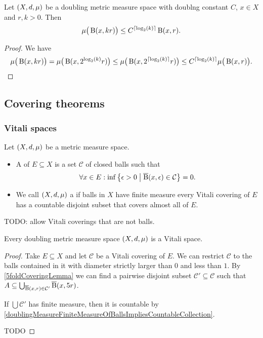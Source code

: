 \begin{lemma}
Let $\sSet{X,d,\mu}$ be a doubling metric measure space with doublng constant $C$, $x\in X$ and $r,k>0$. Then
\[ \mu\big(\operatorname{B}(x,kr)\big) \leq C^{\lceil\log_2(k)\rceil}\operatorname{B}(x,r). \]
\end{lemma}
\begin{proof}
We have
\[ \mu\big(\operatorname{B}(x,kr)\big) = \mu\big(\operatorname{B}(x,2^{\log_2(k)}r)\big) \leq \mu\big(\operatorname{B}(x,2^{\lceil\log_2(k)\rceil}r)\big) \leq C^{\lceil\log_2(k)\rceil}\mu\big(\operatorname{B}(x,r)\big). \]
\end{proof}

\subsection{Covering theorems}
\subsubsection{Vitali spaces}
\begin{definition}
Let $\sSet{X,d,\mu}$ be a metric measure space.
\begin{itemize}
\item A  of $E\subseteq X$ is a set $\mathcal{C}$ of closed balls such that 
\[ \forall x\in E: \inf \setbuilder{\epsilon > 0}{\cball(x,\epsilon) \in \mathcal{C}} = 0. \]
\item We call $\sSet{X,d,\mu}$ a  if balls in $X$ have finite measure every Vitali covering of $E$ has a countable disjoint subset that covers almost all of $E$.
\end{itemize}
\end{definition}
TODO: allow Vitali coverings that are not balls.

\begin{theorem}
Every doubling metric measure space $\sSet{X,d,\mu}$ is a Vitali space.
\end{theorem}
\begin{proof}
Take $E\subseteq X$ and let $\mathcal{C}$ be a Vitali covering of $E$. We can restrict $\mathcal{C}$ to the balls contained in it with diameter strictly larger than $0$ and less than $1$. By \ref{5foldCoveringLemma} we can find a pairwise disjoint subset $\mathcal{C}'\subseteq \mathcal{C}$ such that $A\subseteq \bigcup_{\operatorname{\overline{B}}(x,r)\in \mathcal{C}'}\operatorname{\overline{B}}(x,5r)$.

If $\bigcup \mathcal{C}'$ has finite measure, then it is countable by \ref{doublingMeasureFiniteMeasureOfBallsImpliesCountableCollection}.

TODO
\end{proof}

